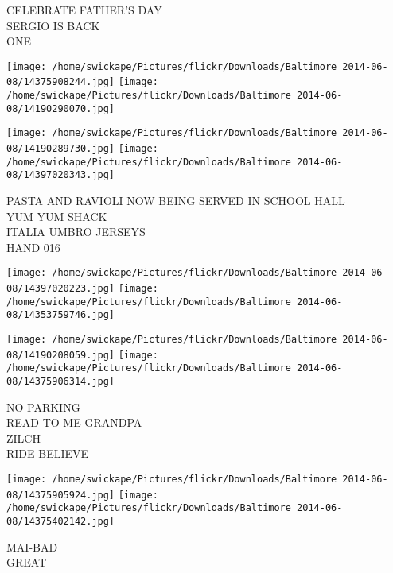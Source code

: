 \documentclass[10pt,letterpaper]{article}
\begin{document}
CELEBRATE FATHER'S DAY\\
SERGIO IS BACK\\
ONE\\
\pagebreak

\texttt{[image: /home/swickape/Pictures/flickr/Downloads/Baltimore 2014-06-08/14375908244.jpg]}
\texttt{[image: /home/swickape/Pictures/flickr/Downloads/Baltimore 2014-06-08/14190290070.jpg]}

\texttt{[image: /home/swickape/Pictures/flickr/Downloads/Baltimore 2014-06-08/14190289730.jpg]}
\texttt{[image: /home/swickape/Pictures/flickr/Downloads/Baltimore 2014-06-08/14397020343.jpg]}

PASTA AND RAVIOLI NOW BEING SERVED IN SCHOOL HALL\\
YUM YUM SHACK\\
ITALIA UMBRO JERSEYS\\
HAND 016\\
\pagebreak

\texttt{[image: /home/swickape/Pictures/flickr/Downloads/Baltimore 2014-06-08/14397020223.jpg]}
\texttt{[image: /home/swickape/Pictures/flickr/Downloads/Baltimore 2014-06-08/14353759746.jpg]}

\texttt{[image: /home/swickape/Pictures/flickr/Downloads/Baltimore 2014-06-08/14190208059.jpg]}
\texttt{[image: /home/swickape/Pictures/flickr/Downloads/Baltimore 2014-06-08/14375906314.jpg]}

NO PARKING\\
READ TO ME GRANDPA\\
ZILCH\\
RIDE BELIEVE\\
\pagebreak

\texttt{[image: /home/swickape/Pictures/flickr/Downloads/Baltimore 2014-06-08/14375905924.jpg]}
\texttt{[image: /home/swickape/Pictures/flickr/Downloads/Baltimore 2014-06-08/14375402142.jpg]}

MAI{-}BAD\\
GREAT\\
\pagebreak
\end{document}
